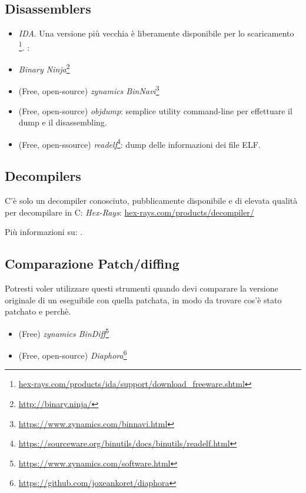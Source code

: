 \subsection{Disassemblers}


\begin{itemize}
\item \emph{IDA}. Una versione più vecchia è liberamente disponibile per lo scaricamento
\footnote{\href{http://go.yurichev.com/17031}{hex-rays.com/products/ida/support/download\_freeware.shtml}}.
\ShortHotKeyCheatsheet: 

\item \emph{Binary Ninja}\footnote{\url{http://binary.ninja/}}

\item (Free, open-source) \emph{zynamics BinNavi}\footnote{\url{https://www.zynamics.com/binnavi.html}}

\item (Free, open-source) \emph{objdump}: semplice utility command-line per effettuare il dump e il disassembling.

\item (Free, open-ssource) \emph{readelf}\footnote{\url{https://sourceware.org/binutils/docs/binutils/readelf.html}}:
dump delle informazioni dei file ELF.
\end{itemize}

\subsection{Decompilers}

C'è solo un decompiler conosciuto, pubblicamente disponibile e di elevata qualità per decompilare in C: \emph{Hex-Rays}:
\href{http://go.yurichev.com/17033}{hex-rays.com/products/decompiler/}

Più informazioni su: .

\subsection{Comparazione Patch/diffing}

Potresti voler utilizzare questi strumenti quando devi comparare la versione originale di un eseguibile con quella patchata,
in modo da trovare cos'è stato patchato e perchè.

\begin{itemize}
\item (Free) \emph{zynamics BinDiff}\footnote{\url{https://www.zynamics.com/software.html}}

\item (Free, open-source) \emph{Diaphora}\footnote{\url{https://github.com/joxeankoret/diaphora}}
\end{itemize}


